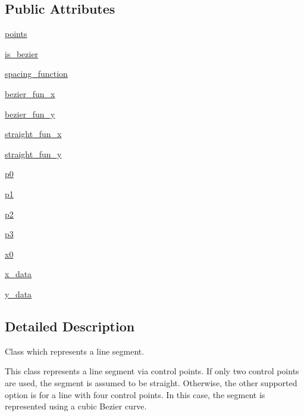 \subsection*{Public Attributes}
\begin{DoxyCompactItemize}
\item 
\hyperlink{classaflr2utils_1_1geometry_1_1Segment_a281bab017d233a8a3cb6a849beae61de}{points}
\item 
\hyperlink{classaflr2utils_1_1geometry_1_1Segment_ac9e73388b23d157db7215d7b63d872da}{is\-\_\-bezier}
\item 
\hyperlink{classaflr2utils_1_1geometry_1_1Segment_aa7a48fde43dae04ccb412bf13c46b2a3}{spacing\-\_\-function}
\item 
\hyperlink{classaflr2utils_1_1geometry_1_1Segment_a34594d25c1052f4de37722628de84519}{bezier\-\_\-fun\-\_\-x}
\item 
\hyperlink{classaflr2utils_1_1geometry_1_1Segment_a944611848daf7b9babd58b41d05e9c71}{bezier\-\_\-fun\-\_\-y}
\item 
\hyperlink{classaflr2utils_1_1geometry_1_1Segment_aa735d11d57c578d7e6b416ad04528aa5}{straight\-\_\-fun\-\_\-x}
\item 
\hyperlink{classaflr2utils_1_1geometry_1_1Segment_aa236e2051abc16ba1972d453f7f66548}{straight\-\_\-fun\-\_\-y}
\item 
\hyperlink{classaflr2utils_1_1geometry_1_1Segment_a5f92987f23649c1abe04ab5e39431061}{p0}
\item 
\hyperlink{classaflr2utils_1_1geometry_1_1Segment_ab9d72d9934dc4f8b451b5a9240ca26a7}{p1}
\item 
\hyperlink{classaflr2utils_1_1geometry_1_1Segment_a8fc5a71da96ed3f1168d82a4c3f3b5eb}{p2}
\item 
\hyperlink{classaflr2utils_1_1geometry_1_1Segment_a026c1104ee1206b725c45e4a9544176f}{p3}
\item 
\hyperlink{classaflr2utils_1_1geometry_1_1Segment_a95145244b97295a83de24aa19fe14daa}{x0}
\item 
\hyperlink{classaflr2utils_1_1geometry_1_1Segment_afca8fb4e8dfffb9caed31124f6d1430b}{x\-\_\-data}
\item 
\hyperlink{classaflr2utils_1_1geometry_1_1Segment_a0804de14b408f9c3fb8dd977df41e107}{y\-\_\-data}
\end{DoxyCompactItemize}


\subsection{Detailed Description}
\begin{DoxyVerb}Class which represents a line segment.

This class represents a line segment via control points.  If only two
control points are used, the segment is assumed to be straight.  Otherwise,
the other supported option is for a line with four control points.  In this
case, the segment is represented using a cubic Bezier curve.
\end{DoxyVerb}
 

